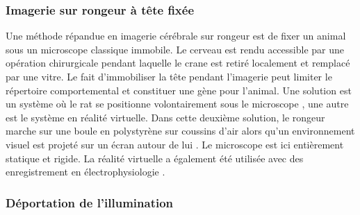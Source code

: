 
\subsubsection{Imagerie sur rongeur à tête fixée}

Une méthode répandue en imagerie cérébrale sur rongeur est de fixer un animal sous un microscope classique immobile. Le cerveau est rendu accessible par une opération chirurgicale pendant laquelle le crane est retiré localement et remplacé par une vitre. Le fait d'immobiliser la tête pendant l'imagerie peut limiter le répertoire comportemental et constituer une gène pour l'animal. Une solution est un système où le rat se positionne volontairement sous le microscope \cite{scott_cellular_2013}, une autre est le système en réalité virtuelle. Dans cette deuxième solution, le rongeur marche sur une boule en polystyrène sur coussins d'air alors qu'un environnement visuel est projeté sur un écran autour de lui \cite{dombeck_functional_2010}. Le microscope est ici entièrement statique et rigide. La réalité virtuelle a également été utilisée avec des enregistrement en électrophysiologie \cite{aronov_engagement_2014}\cite{whitlock_navigating_2014}.




\subsubsection{Déportation de l'illumination}

